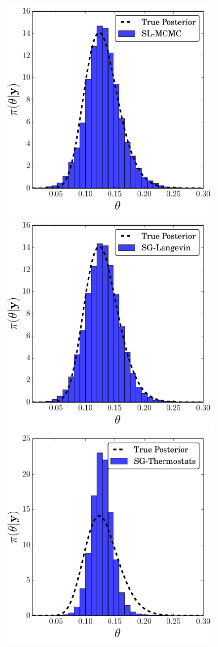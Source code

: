 \documentclass[]{article}
\begin{document}
\begin{figure}[t]
\vskip 0.2in
\begin{center}
\includegraphics[width=0.32\columnwidth]{./images/exp-SL-MCMC-posterior-hist-omega-rate-100p0-chain0.pdf}
\includegraphics[width=0.32\columnwidth]{./images/exp-SG-Langevin-posterior-hist-omega-rate-100p0-chain0.pdf}
\includegraphics[width=0.32\columnwidth]{./images/exponential/exp3-SG-Thermostats-posterior-hist-omega-rate-100p0-chain0.pdf}


\end{center}
\end{figure}
\end{document}
